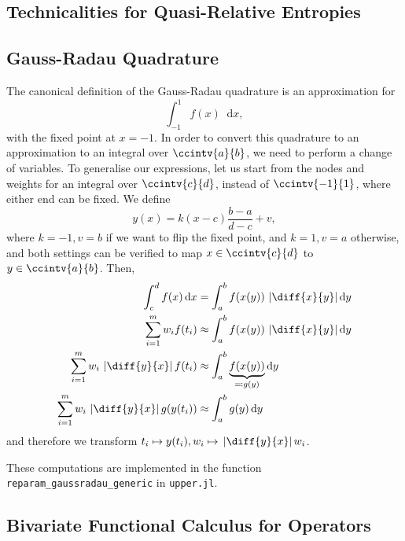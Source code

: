 \documentclass[10pt, a4paper]{article}
\numberwithin{equation}{section} %
\theoremstyle{definition}
\theoremstyle{plain}
\newcommand{\abs}[1]{\mathop{}\left\lvert#1\right\rvert}
\newcommand{\dif}{\mathop{}\!\mathrm{d}} %
\newcommand{\?}{\mathrel{?}} %
\begin{document}
\begin{appendices}
                          \section{Technicalities for Quasi-Relative Entropies}\label{sec:qretech}

                          \subsection{Gauss-Radau Quadrature}\label{sec:qretech_grq}

                          The canonical definition of the Gauss-Radau quadrature is an approximation for
                          \[ \int_{-1}^{1} f(x) \dif{x}, \]
                          with the fixed point at \(x = -1\). In order to convert this quadrature to an approximation to an integral over \(\ccintv{a}{b}\), we need to perform a change of variables. To generalise our expressions, let us start from the nodes and weights for an integral over \(\ccintv{c}{d}\), instead of \(\ccintv{-1}{1}\), where either end can be fixed. We define
                          \begin{equation} y(x) = k(x - c)\frac{b - a}{d - c} + v, \end{equation}
                          where \(k = -1, v = b\) if we want to flip the fixed point, and \(k = 1, v = a\) otherwise, and both settings can be verified to map \(x\in\ccintv{c}{d}\) to \(y\in\ccintv{a}{b}\). Then,
                          \begin{align*}
                            \int_{c}^{d} f(x) \dif{x} &= \int_{a}^{b} f(x(y)) \abs{\diff{x}{y}} \dif{y} \\
                            \sum_{i=1}^m w_i f(t_i) &\approx \int_{a}^{b} f(x(y)) \abs{\diff{x}{y}} \dif{y} \\
                            \sum_{i=1}^m w_i \abs{\diff{y}{x}} f(t_i) &\approx \int_{a}^{b} \underbrace{f(x(y))}_{\eqqcolon g(y)} \dif{y} \\
                            \sum_{i=1}^m w_i \abs{\diff{y}{x}} g(y(t_i)) &\approx \int_{a}^{b} g(y) \dif{y}
                          \end{align*}
                          and therefore we transform \(t_i \mapsto y(t_i), w_i \mapsto \abs{\diff{y}{x}} w_i\).

                          These computations are implemented in the function \verb`reparam_gaussradau_generic` in \verb`upper.jl`. 

                          \subsection{Bivariate Functional Calculus for Operators}


\end{appendices}
\end{document}
